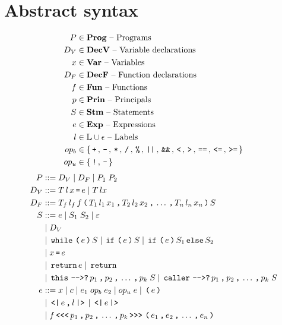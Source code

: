 \section{Abstract syntax}

\begin{align*}
  P       & \in \mathbf{Prog} \text{ -- Programs}\\
  D_V     & \in \mathbf{DecV} \text{ -- Variable declarations}\\
  x       & \in \mathbf{Var} \text{ -- Variables}\\
  D_F     & \in \mathbf{DecF} \text{ -- Function declarations}\\
  f       & \in \mathbf{Fun} \text{ -- Functions}\\
  p       & \in \mathbf{Prin} \text{ -- Principals}\\
  S       & \in \mathbf{Stm} \text{ -- Statements}\\
  e       & \in \mathbf{Exp} \text{ -- Expressions}\\
  l       & \in \mathbb{L} \cup \epsilon \text{ -- Labels}\\
  op_b    & \in \{ \, \texttt{+} \, ,  \, \texttt{-} \, ,  \, \texttt{*} \, ,  \, \texttt{/} \, ,  \, \texttt{\%} \, ,  \, \texttt{||} \, ,  \, \texttt{\&\&} \, ,  \, \texttt{<} \, ,  \, \texttt{>} \, ,  \, \texttt{==} \, ,  \, \texttt{<=} \, ,  \, \texttt{>=} \, \} \\
  op_u    & \in \{ \, \texttt{!} \, ,  \, \texttt{-} \, \}
\end{align*}
\begin{align*}
  P         & ::= D_V \gp D_F \gp P_1 \; P_2 \\
  D_V       & ::= T \, l \, x \tk = e \gp T \, l x \\
  D_F       & ::= T_f \, l_f \, f \tk ( T_1 \, l_1 \, x_1 \tk , T_2 \, l_2 \, x_2 \tk , \dots \tk , T_n \, l_n \, x_n \tk ) S \\
  S         & ::= e \gp S_1 \; S_2 \gp \varepsilon \\
            & \gp D_V \\
            & \gp \tk{while} \tk ( e \tk ) S \gp \tk{if} \tk ( e \tk ) S \gp \tk{if} \tk ( e \tk ) S_1 \tk{else} S_2 \\
            & \gp x \tk = e \\
            & \gp \tk{return} e \gp \tk{return} \\
            & \gp \tk{this} \tk{-{}->?} p_1 \tk , p_2 \tk , \dots \tk , p_k \; S \gp \tk{caller} \tk{-{}->?} p_1 \tk , p_2 \tk , \dots \tk , p_k \; S \\
  e         & ::= x \gp c \gp e_1 \; op_b \; e_2 \gp op_u \; e \gp \tk ( e \tk ) \\
            & \gp \tk{<|} e \tk , l \tk{|>} \gp \tk{<|} e \tk{|>} \\
            & \gp f \tk{<{}<{}<} p_1 \tk , p_2 \tk , \dots \tk , p_k \tk{>{}>{}>} \tk ( e_1 \tk , e_2 \tk , \dots \tk , e_n \tk )
\end{align*}
